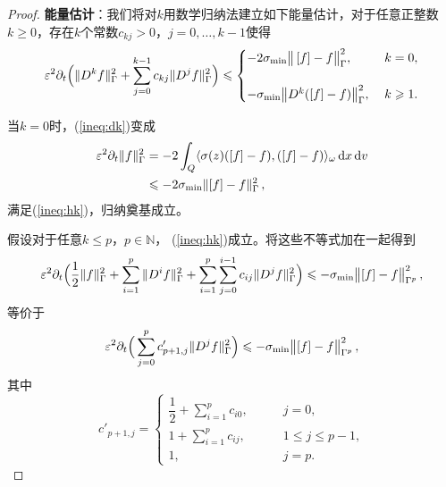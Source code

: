 \begin{proof}
  {\bf 能量估计}：我们将对$k$用数学归纳法建立如下能量估计，对于任意正整数$k\ge 0$，存在$k$个常数$c_{kj}>0$，$j=0,\dots, k-1$使得
  \begin{equation}\label{ineq:hk}
    \varepsilon^2\partial_t\Big(\|D^k f\|^2_{\Gamma} + \sum_{j=0}^{k-1} c_{kj}\|D^j f\|^2_{\Gamma}\Big) \leqslant
    \begin{cases}
      -2\sigma_{\mathrm{min}}\big\|\left[ f \right] - f\big\|^2_{\Gamma}, \; & k=0,
      \\ \\
      -\sigma_{\mathrm{min}}\big\|D^k(\left[ f \right] - f)\big\|^2_{\Gamma}, \; & k \geqslant 1.
    \end{cases}
  \end{equation}

  当$k=0$时，(\ref{ineq:dk})变成
  \begin{equation}
    \begin{split}
      \varepsilon^2\partial_t\|f\|^2_{\Gamma} & = -2\int_Q \langle \sigma(z)([f]-f), ([f]-f) \rangle_{\omega}\mathop{}\!\mathrm{d} x\mathop{}\!\mathrm{d} v
      \\
      & \leqslant -2\sigma_{\mathrm{min}} \|[f] - f\|^2_{\Gamma}\,,
    \end{split}
  \end{equation}
  满足(\ref{ineq:hk})，归纳奠基成立。

  假设对于任意$k\le p$，$p\in\mathbb{N}$， (\ref{ineq:hk})成立。将这些不等式加在一起得到
  \begin{equation}
    \varepsilon^2\partial_t\Big(\frac{1}{2}\|f\|^2_{\Gamma} + \sum_{i=1}^{p}\|D^i f\|^2_{\Gamma} + \sum_{i=1}^{p}\sum_{j=0}^{i-1}c_{ij}\|D^j f\|^2_{\Gamma}\Big)\leqslant -\sigma_{\mathrm{min}}\big\|[f]-f\big\|^2_{\Gamma^{p}}\,,
  \end{equation}
  等价于
  \begin{equation}\label{eq:dk_sum}
    \varepsilon^2\partial_t\Big(\sum_{j=0}^{p}c'_{p+1, j}\|D^j f\|^2_{\Gamma}\Big)\leqslant -\sigma_{\mathrm{min}}\big\|[f]-f\big\|^2_{\Gamma^{p}}\,,
  \end{equation}
  其中
  \begin{equation}
    c'_{p+1, j} =
    \begin{cases}
      \dfrac{1}{2} + \sum\limits_{i=1}^p c_{i 0}, \qquad & j=0,
      \\
      1 + \sum\limits_{i=1}^p c_{i j}, \qquad & 1\le j\le p-1,
      \\
      1, \qquad & j=p.
    \end{cases}
  \end{equation}


\end{proof}
